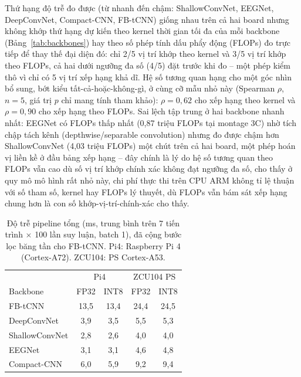 \documentclass[11pt,a4paper,twoside,asymmetric]{article}
\begin{document}
Thứ hạng độ trễ đo được (từ nhanh đến chậm: ShallowConvNet, EEGNet, DeepConvNet, Compact-CNN,
FB-tCNN) giống nhau trên cả hai board nhưng không khớp thứ hạng dự kiến theo kernel thời gian tối đa
của mỗi backbone (Bảng~\ref{tab:backbones}) hay theo số phép tính dấu phẩy động (FLOPs) đo trực
tiếp để thay thế đại diện đó: chỉ 2/5 vị trí khớp theo kernel và 3/5 vị trí khớp theo FLOPs, cả hai
dưới ngưỡng đa số (4/5) đặt trước khi đo -- một phép kiểm thô vì chỉ có 5 vị trí xếp hạng khả dĩ. Hệ số tương quan hạng cho một góc nhìn bổ sung, bớt kiểu tất-cả-hoặc-không-gì, ở cùng cỡ mẫu nhỏ này (Spearman $\rho$, $n=5$, giá trị $p$ chỉ mang tính tham khảo): $\rho=0,62$ cho xếp hạng theo kernel và $\rho=0,90$ cho xếp hạng theo FLOPs.
Sai lệch tập trung ở hai backbone nhanh nhất: EEGNet có
FLOPs thấp nhất (0,87 triệu FLOPs tại montage 3C) nhờ tích chập tách kênh (depthwise/separable
convolution) nhưng đo được chậm hơn ShallowConvNet (4,03 triệu FLOPs) một chút trên cả hai board, một phép hoán vị liền kề ở đầu bảng xếp hạng -- đây chính là lý do hệ số tương quan theo FLOPs vẫn cao dù số vị trí khớp chính xác không đạt ngưỡng đa số,
cho thấy ở quy mô mô hình rất nhỏ này, chi phí thực thi trên CPU ARM không tỉ lệ thuận với số tham
số, kernel hay FLOPs lý thuyết, dù FLOPs vẫn bám sát xếp hạng chung hơn là con số khớp-vị-trí-chính-xác cho thấy.

\begin{table}[htbp]
\caption{Độ trễ pipeline tổng (ms, trung bình trên 7 tiến trình $\times$ 100 lần suy luận, batch 1), đã cộng bước lọc băng tần cho FB-tCNN. Pi4: Raspberry Pi 4 (Cortex-A72). ZCU104: PS Cortex-A53.}
\label{tab:rq4latency}
\begin{center}
\footnotesize
\begin{tabular}{lcccc}
\toprule
 & \multicolumn{2}{c}{Pi4} & \multicolumn{2}{c}{ZCU104 PS} \\
Backbone & FP32 & INT8 & FP32 & INT8 \\
\midrule
FB-tCNN & 13,5 & 13,4 & 24,4 & 24,5 \\
DeepConvNet & 3,9 & 3,5 & 5,5 & 5,3 \\
ShallowConvNet & 2,8 & 2,6 & 4,0 & 4,0 \\
EEGNet & 3,1 & 3,1 & 4,6 & 4,8 \\
Compact-CNN & 6,0 & 5,9 & 9,2 & 9,4 \\
\bottomrule
\end{tabular}
\end{center}
\end{table}
\end{document}
